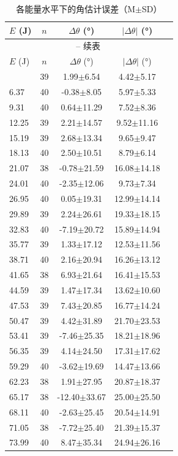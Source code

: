 \begin{longtable}{lcccc}
  \caption{各能量水平下的角估计误差（M$\pm$SD）} \label{tab:desc-elevel} \\
  \toprule
  $E$ (J) & $n$ & $\Delta\theta$ (°) & $|\Delta\theta|$ (°) \\
  \midrule
  \endfirsthead
  \multicolumn{4}{c}{\tablename\ \thetable{} -- 续表} \\
  \toprule
  $E$ (J) & $n$ & $\Delta\theta$ (°) & $|\Delta\theta|$ (°) \\
  \midrule
  \endhead
  \bottomrule
  \endfoot
  3.43 & 39 & 1.99$\pm$6.54 & 4.42$\pm$5.17 \\
  6.37 & 40 & -0.38$\pm$8.05 & 5.97$\pm$5.33 \\
  9.31 & 40 & 0.64$\pm$11.29 & 7.52$\pm$8.36 \\
  12.25 & 39 & 2.21$\pm$14.57 & 9.52$\pm$11.16 \\
  15.19 & 39 & 2.68$\pm$13.34 & 9.65$\pm$9.47 \\
  18.13 & 40 & 2.50$\pm$10.51 & 8.79$\pm$6.14 \\
  21.07 & 38 & -0.78$\pm$21.59 & 16.08$\pm$14.18 \\
  24.01 & 40 & -2.35$\pm$12.06 & 9.73$\pm$7.34 \\
  26.95 & 40 & 0.05$\pm$19.31 & 12.99$\pm$14.14 \\
  29.89 & 39 & 2.24$\pm$26.61 & 19.33$\pm$18.15 \\
  32.83 & 40 & -7.19$\pm$20.72 & 15.89$\pm$14.94 \\
  35.77 & 39 & 1.33$\pm$17.12 & 12.53$\pm$11.56 \\
  38.71 & 40 & 2.16$\pm$20.94 & 16.26$\pm$13.12 \\
  41.65 & 38 & 6.93$\pm$21.64 & 16.41$\pm$15.53 \\
  44.59 & 39 & 1.47$\pm$17.34 & 13.62$\pm$10.60 \\
  47.53 & 39 & 7.43$\pm$20.85 & 16.77$\pm$14.24 \\
  50.47 & 39 & 4.42$\pm$31.89 & 21.70$\pm$23.53 \\
  53.41 & 39 & -7.46$\pm$25.35 & 18.21$\pm$18.96 \\
  56.35 & 39 & 4.14$\pm$24.50 & 17.31$\pm$17.62 \\
  59.29 & 40 & -3.62$\pm$19.69 & 14.47$\pm$13.66 \\
  62.23 & 38 & 1.91$\pm$27.95 & 20.87$\pm$18.37 \\
  65.17 & 38 & -12.40$\pm$33.67 & 25.00$\pm$25.50 \\
  68.11 & 40 & -2.63$\pm$25.45 & 20.54$\pm$14.91 \\
  71.05 & 38 & -7.72$\pm$25.40 & 21.39$\pm$15.37 \\
  73.99 & 40 & 8.47$\pm$35.34 & 24.94$\pm$26.16 \\
\end{longtable}
